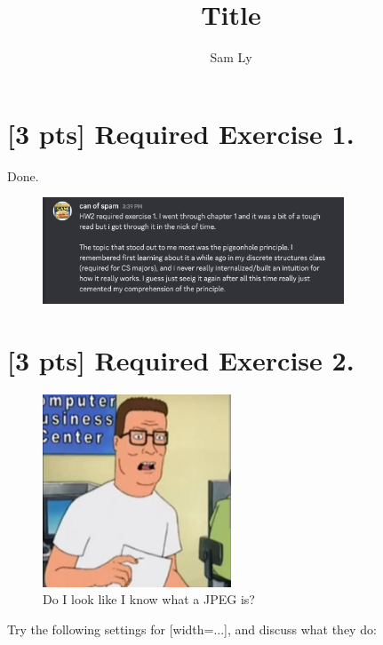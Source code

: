 \documentclass{article}
\title{Title}
\author{Sam Ly}
\begin{document}
\maketitle

\section*{[3 pts] Required Exercise 1.}

Done.

\begin{figure}[htbp]
    \centering
    \includegraphics[width=0.8\textwidth]{figures/prompt.png}
\end{figure}

\section*{[3 pts] Required Exercise 2.}

\begin{figure}[h]
    \centering
    \includegraphics[width=0.5\textwidth]{figures/hank.jpeg}
    \caption{Do I look like I know what a JPEG is?}
\end{figure}

Try the following settings for [width=...], and discuss what they do: 
\end{document}
